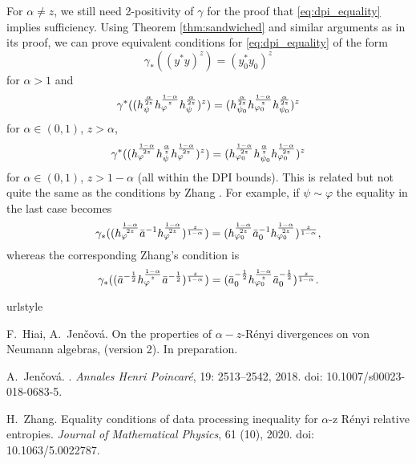 \documentclass[12pt]{article}
\theoremstyle{definition}
\theoremstyle{remark}
\def\ffi{\varphi}
\begin{document}
For $\alpha\ne z$, we still need 2-positivity of $\gamma$ for the proof that
\eqref{eq:dpi_equality} implies sufficiency. Using Theorem \ref{thm:sandwiched} and
similar arguments as in its proof, we can prove equivalent conditions for
\eqref{eq:dpi_equality} of the form 
\[
\gamma_*((y^*y)^z)=(y_0^*y_0)^z
\]
for $\alpha>1$ and
\[
\gamma^*((h_\psi^{\alpha\over 2z}h_\ffi^{1-\alpha\over z}h_\psi^{\alpha\over
2z})^z)=(h_{\psi_0}^{\alpha\over 2z}h_{\ffi_0}^{1-\alpha\over z}h_{\psi_0}^{\alpha\over 2z})^z
\]
for $\alpha\in (0,1)$, $z>\alpha$,
\[
\gamma^*((h_\ffi^{1-\alpha\over 2z}h_\psi^{\alpha\over z}h_\ffi^{1-\alpha\over
2z})^z)=(h_{\ffi_0}^{1-\alpha\over 2z}h_{\psi_0}^{\alpha\over z}h_{\ffi_0}^{1-\alpha\over 2z})^z
\]
for $\alpha\in (0,1)$, $z>1-\alpha$ (all within the DPI bounds).
This is related but not quite the same as the conditions by Zhang
\cite{zhang2020equality}. For example, if $\psi\sim\ffi$ the equality in the last case
becomes
\[
\gamma_*((h_\ffi^{1-\alpha\over2z}\bar
a^{-1}h_\ffi^{1-\alpha\over2z})^{z\over 1-\alpha})=(h_{\ffi_0}^{1-\alpha\over2z}\bar
a_0^{-1}h_{\ffi_0}^{1-\alpha\over2z})^{z\over 1-\alpha},
\]
whereas the corresponding Zhang's condition is
\[
\gamma_*((\bar a^{-\frac12}h_\ffi^{1-\alpha\over z}\bar a^{-\frac12})^{z\over 1-\alpha})=
(\bar a_0^{-\frac12}h_{\ffi_0}^{1-\alpha\over z}\bar a_0^{-\frac12})^{z\over 1-\alpha}.
\]

%
%

\begin{thebibliography}{2}
\providecommand{\natexlab}[1]{#1}
\providecommand{\url}[1]{\texttt{#1}}
\expandafter\ifx\csname urlstyle\endcsname\relax
  \providecommand{\doi}[1]{doi: #1}\else
  \providecommand{\doi}{doi: \begingroup \urlstyle{rm}\Url}\fi

F.~Hiai, A.~Jen\v cov\'a. On the properties of $\alpha-z$-R\'enyi divergences on von
Neumann algebras, (version 2). In preparation.

A.~Jen{\v c}ov{\'a}.
.
\newblock \emph{Annales Henri Poincar{\'e}}, 19: 2513--2542, 2018.
\newblock \doi{10.1007/s00023-018-0683-5}.

H.~Zhang.
\newblock Equality conditions of data processing inequality for $\alpha$-z
  R{\'e}nyi relative entropies.
\newblock \emph{Journal of Mathematical Physics}, 61 (10), 2020.
\newblock \doi{10.1063/5.0022787}.

\end{thebibliography}
\end{document}
